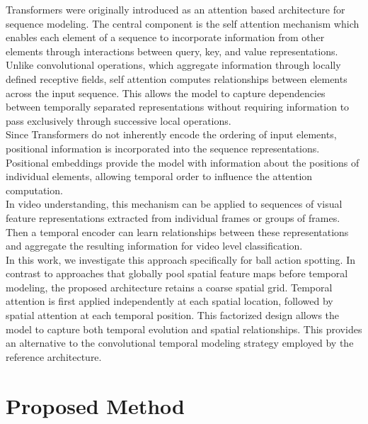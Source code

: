 \documentclass[conference]{IEEEtran}
\begin{document}
Transformers \cite{vaswani2023attentionneed} were originally introduced as an attention based architecture for sequence modeling. The central component is the self attention mechanism which enables each element of a sequence to incorporate information from other elements through interactions between query, key, and value representations.\\
Unlike convolutional operations, which aggregate information through locally defined receptive fields, self attention computes relationships between elements across the input sequence. This allows the model to capture dependencies between temporally separated representations without requiring information to pass exclusively through successive local operations.\\
Since Transformers do not inherently encode the ordering of input elements, positional information is incorporated into the sequence representations. Positional embeddings provide the model with information about the positions of individual elements, allowing temporal order to influence the attention computation.\\
In video understanding, this mechanism can be applied to sequences of visual feature representations extracted from individual frames or groups of frames. Then a temporal encoder can learn relationships between these representations and aggregate the resulting information for video level classification.\\
In this work, we investigate this approach specifically for ball action spotting. In contrast to approaches that globally pool spatial feature maps before temporal modeling, the proposed architecture retains a coarse spatial grid. Temporal attention is first applied independently at each spatial location, followed by spatial attention at each temporal position. This factorized design allows the model to capture both temporal evolution and spatial relationships. This provides an alternative to the convolutional temporal modeling strategy employed by the reference architecture.\\

\section{Proposed Method}
\end{document}
